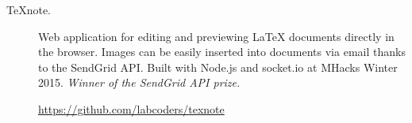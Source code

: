 \documentclass{article}
\begin{document}
\begin{description}




  \item[TeXnote.]
    Web application for editing and previewing \LaTeX{} documents directly in
    the browser. Images can be easily inserted into documents via email thanks
    to the SendGrid API. Built with Node.js and socket.io at MHacks Winter
    2015. \emph{Winner of the SendGrid API prize.}

    \url{https://github.com/labcoders/texnote}
\end{description}
\end{document}
